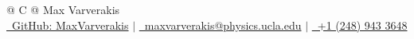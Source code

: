 \documentclass[a4paper,11pt]{article}
\begin{document}
\pagestyle{empty} 



\begin{tabularx}{\linewidth}{@{} C @{}}
\Huge{Max Varverakis} \\[7.5pt]
\href{https://github.com/MaxVarverakis}{\raisebox{-0.05\height}\faGithub\ GitHub: MaxVarverakis} $|$ 
\href{mailto:maxvarverakis@physics.ucla.edu}{\raisebox{-0.05\height}\faEnvelope \ maxvarverakis@physics.ucla.edu} $|$ 
\href{tel:+12489433648}{\raisebox{-0.05\height}\faMobile \ +1 (248) 943 3648} \\
\end{tabularx}


\end{document}
